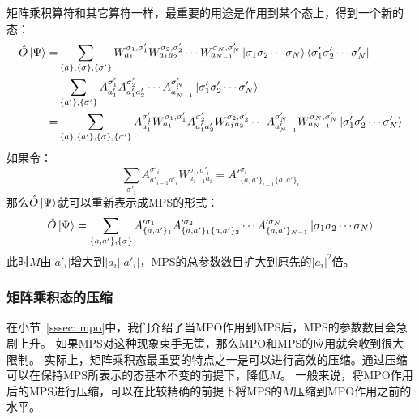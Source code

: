 \documentclass{article}
\begin{document}
矩阵乘积算符和其它算符一样，最重要的用途是作用到某个态上，得到一个新的态：
\begin{equation}
\begin{aligned}
    \hat{O} \ket{\Psi} = 
       & \sum_{\{a\},\{\sigma\},\{\sigma'\}}
         W^{\sigma_1, \sigma'_1}_{a_1} W^{\sigma_2, \sigma'_2}_{a_1a_2} \cdots
                        W^{\sigma_N, \sigma'_N}_{a_{N-1}} 
                        \ket{\sigma_1\sigma_2\cdots\sigma_N}
                        \bra{\sigma'_1\sigma'_2 \cdots \sigma'_N} \\
        & \sum_{\{a'\},\{\sigma'\}}
     A^{\sigma'_1}_{a'_1} A^{\sigma'_2}_{a'_1a'_2} \cdots
           A^{\sigma'_N}_{a'_{N-1}}  \ket{ \sigma'_1\sigma'_2\cdots\sigma'_N } \\
      = & \sum_{\{a\},\{a'\}, \{\sigma\},\{\sigma'\}}
           A^{\sigma'_1}_{a'_1} W^{\sigma_1, \sigma'_1}_{a_1} 
           A^{\sigma'_2}_{a'_1a'_2} W^{\sigma_2, \sigma'_2}_{a_1a_2} \cdots
           A^{\sigma'_N}_{a'_{N-1}} W^{\sigma_N, \sigma'_N}_{a_{N-1}}
           \ket{ \sigma'_1\sigma'_2\cdots\sigma'_N } \\
\end{aligned}
\end{equation}
如果令：
\begin{equation}
    \sum_{\sigma'_i} A^{\sigma'_i}_{a'_{i-1}a'_{i}} W^{\sigma_i, \sigma'_i}_{a_{i-1}a_{i}}
    = A'^{\sigma_i}_{\{a, a'\}_{i-1}\{a, a'\}_{i}}
\end{equation}
那么$\hat{O} \ket{\Psi}$就可以重新表示成MPS的形式：
\begin{equation}
    \hat{O} \ket{\Psi} = \sum_{\{a, a'\},\{\sigma\}}
           A'^{\sigma_1}_{\{a, a'\}_1} A'^{\sigma_2}_{\{a, a'\}_1\{a, a'\}_2} \cdots
           A'^{\sigma_N}_{\{a, a'\}_{N-1}}  \ket{ \sigma_1\sigma_2\cdots\sigma_N } 
\end{equation}
此时$M$由$|a'_i|$增大到$|a_i|| a'_i|$，MPS的总参数数目扩大到原先的$|a_i|^2$倍。


\subsubsection{矩阵乘积态的压缩}
\label{sssec: compress}
在小节~\ref{sssec: mpo}中，我们介绍了当MPO作用到MPS后，MPS的参数数目会急剧上升。
如果MPS对这种现象束手无策，那么MPO和MPS的应用就会收到很大限制。
实际上，矩阵乘积态最重要的特点之一是可以进行高效的压缩。通过压缩可以在保持MPS所表示的态基本不变的前提下，降低$M$。
一般来说，将MPO作用后的MPS进行压缩，可以在比较精确的前提下将MPS的$M$压缩到MPO作用之前的水平。
\end{document}
